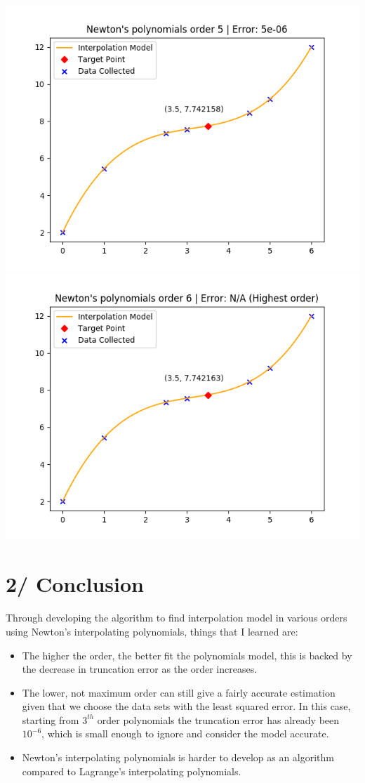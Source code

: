 \documentclass[12pt]{article}
\begin{document}
\begin{center}
        \includegraphics{Order5.png}
        \includegraphics{Order6.png}
      \end{center}
  \part*{2/ Conclusion}
  Through developing the algorithm to find interpolation model in various orders using Newton's interpolating polynomials, things that I learned are:
    \begin{itemize}
      \item The higher the order, the better fit the polynomials model, this is backed by the decrease in truncation error as the order increases.
      \item The lower, not maximum order can still give a fairly accurate estimation given that we choose the data sets with the least squared error.
      In this case, starting from \(3^{th}\) order polynomials the truncation error has already been \(10^{-6}\), which is small enough to ignore and consider the model accurate.
      \item Newton's interpolating polynomials is harder to develop as an algorithm compared to Lagrange's interpolating polynomials.
    \end{itemize}
  
\end{document}
